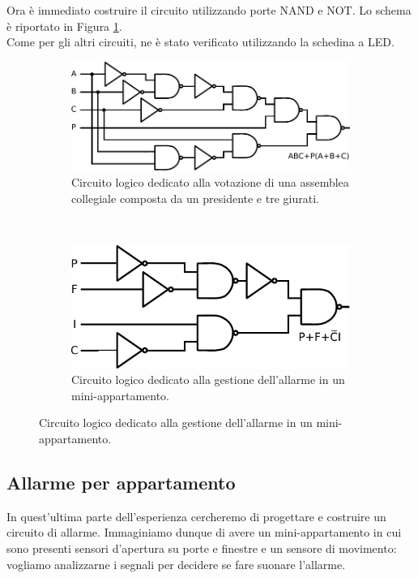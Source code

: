 Ora è immediato costruire il circuito utilizzando porte NAND e NOT.
Lo schema è riportato in Figura \ref{cir9:giudici}.\\
Come per gli altri circuiti, ne è stato verificato utilizzando la schedina a LED. 

\begin{figure}[h]
	\centering
	\begin{subfigure}[b]{0.54\textwidth}
		\centering
		\includegraphics[width=.98\textwidth]{../E09/latex/giudici.pdf}
		\caption{Circuito logico dedicato alla votazione di una assemblea collegiale composta da un presidente e tre giurati.}
		\label{cir9:giudici}
	\end{subfigure}%
	~ \quad
	\begin{subfigure}[b]{0.42\textwidth}
		\centering
		\includegraphics[width=.9\textwidth]{../E09/latex/allarme.pdf}
		\caption{Circuito logico dedicato alla gestione dell'allarme in un mini-appartamento.}
		\label{cir9:allarme}
	\end{subfigure}
\end{figure}

\subsection{Allarme per appartamento}

In quest'ultima parte dell'esperienza cercheremo di progettare e costruire un circuito di allarme. Immaginiamo dunque di avere un mini-appartamento in cui sono presenti sensori d'apertura su porte e finestre e un sensore di movimento: vogliamo analizzarne i segnali per decidere se fare suonare l'allarme.

